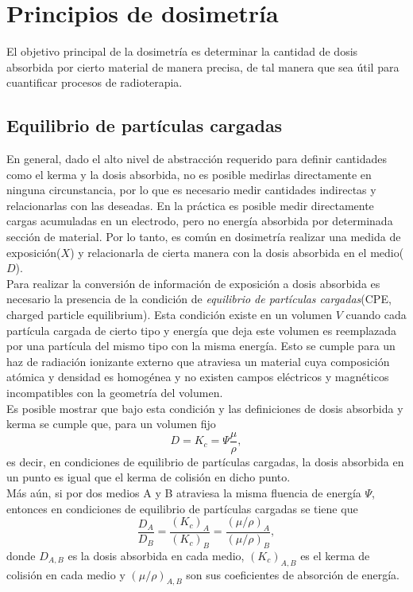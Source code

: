 \section{Principios de dosimetría}
El objetivo principal de la dosimetría es determinar la cantidad de dosis absorbida por cierto material de manera precisa, de tal manera que sea útil para cuantificar procesos de radioterapia.
\subsection{Equilibrio de partículas cargadas}
En general, dado el alto nivel de abstracción requerido para definir cantidades como el kerma y la dosis absorbida, no es posible medirlas directamente en ninguna circunstancia, por lo que es necesario medir cantidades indirectas y relacionarlas con las deseadas. En la práctica es posible medir directamente cargas acumuladas en un electrodo, pero no energía absorbida por determinada sección de material. Por lo tanto, es común en dosimetría realizar una medida de exposición($X$) y relacionarla de cierta manera con la dosis absorbida en el medio($D$).\\

Para realizar la conversión de información de exposición a dosis absorbida es necesario la presencia de la condición de \textit{equilibrio de partículas cargadas}(CPE, charged particle equilibrium). Esta condición existe en un volumen $V$ cuando cada partícula cargada de cierto tipo y energía que deja este volumen es reemplazada por una partícula del mismo tipo con la misma energía.  Esto se cumple para un haz de radiación ionizante externo que atraviesa un material cuya composición atómica y densidad es homogénea y no existen campos eléctricos y magnéticos incompatibles con la geometría del volumen.\\

Es posible mostrar \cite{Attix1986} que bajo esta condición y las definiciones de dosis absorbida y kerma se cumple que, para un volumen fijo 
\begin{equation}
	D=K_c=\Psi \frac{\mu }{\rho},
\end{equation}
es decir, en condiciones de equilibrio de partículas cargadas, la dosis absorbida en un punto es igual que el kerma de colisión en dicho punto.\\

Más aún, si por dos medios A y B atraviesa la misma fluencia de energía $\Psi$, entonces en condiciones de equilibrio de partículas cargadas se tiene que 
\begin{equation}
	\frac{D_A}{D_B}=\frac{(K_c)_A}{(K_c)_B}=\frac{(\mu/\rho)_A}{(\mu/\rho)_B},
\end{equation}
donde $D_{A,B}$ es la dosis absorbida en cada medio, $(K_c)_{A,B}$ es el kerma de colisión en cada medio y $(\mu/\rho)_{A,B}$ son sus coeficientes de absorción de energía.\\

